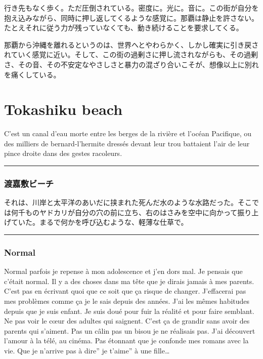 \documentclass[
  letterpaper,
  oneside]{scrbook}
\begin{document}
行き先もなく歩く。ただ圧倒されている。密度に。光に。音に。この街が自分を抱え込みながら、同時に押し返してくるような感覚に。那覇は静止を許さない。たとえそれに従う力が残っていなくても、動き続けることを要求してくる。

那覇から沖縄を離れるというのは、世界へとやわらかく、しかし確実に引き戻されていく感覚に近い。そして、この街の過剰さに押し流されながらも、その過剰さ、その音、その不安定なやさしさと暴力の混ざり合いこそが、想像以上に別れを痛くしている。


\chapter{Tokashiku beach}\label{tokashiku-beach}

C'est un canal d'eau morte entre les berges de la rivière et l'océan
Pacifique, ou des milliers de bernard-l'hermite dressés devant leur trou
battaient l'air de leur pince droite dans des gestes racoleurs.

\begin{center}\rule{0.5\linewidth}{0.5pt}\end{center}

\subsection{渡嘉敷ビーチ}\label{ux6e21ux5609ux6577ux30d3ux30fcux30c1}

それは、川岸と太平洋のあいだに挟まれた死んだ水のような水路だった。そこでは何千ものヤドカリが自分の穴の前に立ち、右のはさみを空中に向かって振り上げていた。まるで何かを呼び込むような、軽薄な仕草で。

\begin{center}\rule{0.5\linewidth}{0.5pt}\end{center}

\subsection{Normal}\label{normal}

Normal parfois je repense à mon adolescence et j'en dors mal. Je pensais
que c'était normal. Il y a des choses dans ma tête que je dirais jamais
à mes parents. C'est pas en écrivant quoi que ce soit que ça risque de
changer. J'effacerai pas mes problèmes comme ça je le sais depuis des
années. J'ai les mêmes habitudes depuis que je suis enfant. Je suis doué
pour fuir la réalité et pour faire semblant. Ne pas voir le cœur des
adultes qui saignent. C'est ça de grandir sans avoir des parents qui
s'aiment. Pas un câlin pas un bisou je ne réalisais pas. J'ai découvert
l'amour à la télé, au cinéma. Pas étonnant que je confonde mes romans
avec la vie. Que je n'arrive pas à dire'' je t'aime'' à une
fille\ldots{}
\end{document}
